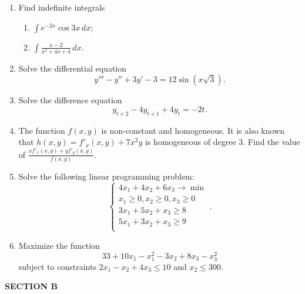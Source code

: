 \documentclass[12pt,a4paper]{article}
\begin{document}
\begin{enumerate}

\item Find indefinite integrals
\begin{enumerate}
  \item  $\int {{e^{ - 2x}}\cos 3x \, dx}$;
  \item  $\int {\frac{{x - 2}}{{{x^2} + 4x + 4}} \, dx}$.
\end{enumerate}

\item Solve the differential equation
\[
y''' - y'' + 3y' - 3 = 12\sin (x\sqrt 3 ).
\]

\item Solve the difference equation
\[
{y_{t + 2}} - 4{y_{t + 1}} + 4{y_t} =  - 2t.
\]

\item The function $f(x, y)$ is non-constant and homogeneous. It is also known that $h(x, y) = f'_x(x, y) + 7x^2y$ is homogeneous of degree 3. Find the value of $\frac{xf'_x(x, y) + yf'_y(x, y)}{f(x, y)}$.

\item Solve the following linear programming problem:
\[
\begin{cases}
4x_1 + 4x_2 + 6x_3 \to \min \\
x_1 \geq 0, x_2 \geq 0, x_3 \geq 0 \\
3x_1 + 5x_2 + x_3 \geq 8 \\
5x_1 + 3x_2 + x_3 \geq 9 \\
\end{cases}.
\]

\item Maximize the function
\[
33 + 10x_1 - x_1^2 -3x_2 + 8x_3 - x_3^2
\]
subject to constraints $2x_1 -x_2+4x_3 \leq 10$ and $x_2 \leq 300$.

\end{enumerate}

\textbf{SECTION B}
\end{document}
